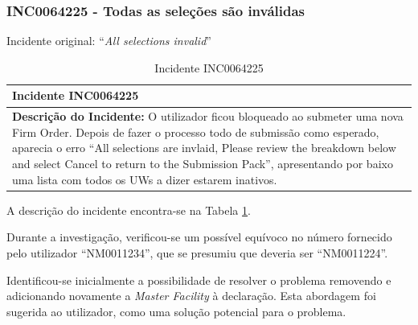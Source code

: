
        \subsubsection{INC0064225 - Todas as seleções são inválidas}\label{secsec:inc0064225} %

            Incidente original: ``\textit{All selections invalid}''


            \begin{table}[H] %
                \centering
                \begin{tabularx}{1\textwidth}{|>{\raggedright\arraybackslash}X|}
                    \hline
                    \rowcolor{lightgray}
                    \textbf{Incidente INC0064225} \\
                    \hline
                    \rowcolor{lightgray!20}
                  
                    \textbf{Descrição do Incidente:} O utilizador ficou bloqueado ao submeter uma nova Firm Order. Depois de fazer o processo todo de submissão como esperado, aparecia o erro ``All selections are invlaid, Please review the breakdown below and select Cancel to return to the Submission Pack'', apresentando por baixo uma lista com todos os UWs a dizer estarem inativos.

                    \\
                    \hline
                \end{tabularx}
                \caption{Incidente INC0064225}\label{table:usincINC0064225}
            \end{table}

            A descrição do incidente encontra-se na Tabela \ref{table:usincINC0064225}.

            Durante a investigação, verificou-se um possível equívoco no número fornecido pelo utilizador ``NM0011234'', que se presumiu que deveria ser ``NM0011224''. 

            Identificou-se inicialmente a possibilidade de resolver o problema removendo e adicionando novamente a \textit{Master Facility} à declaração. Esta abordagem foi sugerida ao utilizador, como uma solução potencial para o problema.
            
